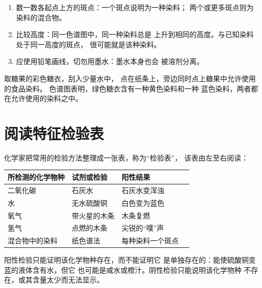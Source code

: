 \begin{method}[读取色谱图]\label{met:g7:identifying-substances:read}
\begin{enumerate}
  \item 数一数各起点上方的斑点：一个斑点说明为一种染料；
        两个或更多斑点则为染料的混合物。
  \item 比较高度：同一色谱图中，同一种染料总是
        上升到相同的高度。与已知染料处于同一高度的斑点，
        很可能就是该种染料。
  \item 应使用铅笔画线，切勿用墨水：墨水本身也会
        被溶剂分离。
\end{enumerate}
\end{method}

\begin{example}[糖果中的染料]\label{ex:g7:identifying-substances:sweets}
取糖果的彩色糖衣，刮入少量水中，
点在纸条上，旁边同时点上糖果中允许使用的食品染料。
色谱图表明，绿色糖衣含有一种黄色染料和一种
蓝色染料，两者都在允许使用的染料之中。
\end{example}


\section{阅读特征检验表}

\begin{proposition}[特征检验表]\label{prop:g7:identifying-substances:bank}
化学家把常用的检验方法整理成一张表，称为“检验表”，
该表由左至右阅读：
\begin{center}
\small
\begin{tabular}{llll}
\hline
所检测的化学物种 & 试剂或检验 & 阳性结果 & \\
\hline
二氧化碳 & 石灰水 & 石灰水变浑浊 & \\
水 & 无水硫酸铜 & 白色变为蓝色 & \\
氧气 & 带火星的木条 & 木条复燃 & \\
氢气 & 点燃的木条 & 尖锐的“噗”声 & \\
混合物中的染料 & 纸色谱法 & 每种染料一个斑点 & \\
\hline
\end{tabular}
\end{center}
\end{proposition}

\begin{remark}[检验不能说明什么]\label{rem:g7:identifying-substances:limits}
阳性检验只能证明该化学物种存在，而不能证明它
是单独存在的：能使硫酸铜变蓝的液体含有水，但它
也可能是咸水或橙汁。阴性检验只能说明该化学物种
不存在，或其含量太少而无法显示。
\end{remark}


